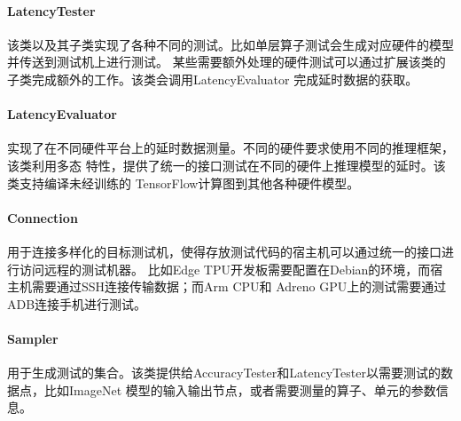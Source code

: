 \paragraph{LatencyTester}
该类以及其子类实现了各种不同的测试。比如单层算子测试会生成对应硬件的模型并传送到测试机上进行测试。
某些需要额外处理的硬件测试可以通过扩展该类的子类完成额外的工作。该类会调用LatencyEvaluator
完成延时数据的获取。

\paragraph{LatencyEvaluator}
实现了在不同硬件平台上的延时数据测量。不同的硬件要求使用不同的推理框架，该类利用多态
特性，提供了统一的接口测试在不同的硬件上推理模型的延时。该类支持编译未经训练的
TensorFlow计算图到其他各种硬件模型。

\paragraph{Connection}
用于连接多样化的目标测试机，使得存放测试代码的宿主机可以通过统一的接口进行访问远程的测试机器。
比如Edge TPU开发板需要配置在Debian的环境，而宿主机需要通过SSH连接传输数据；而Arm CPU和
Adreno GPU上的测试需要通过ADB连接手机进行测试。

\paragraph{Sampler}
用于生成测试的集合。该类提供给AccuracyTester和LatencyTester以需要测试的数据点，比如ImageNet
模型的输入输出节点，或者需要测量的算子、单元的参数信息。
